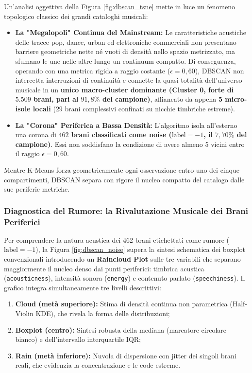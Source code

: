 Un'analisi oggettiva della Figura \ref{fig:dbscan_tsne} mette in luce un fenomeno topologico classico dei grandi cataloghi musicali:
\begin{itemize}
    \item \textbf{La "Megalopoli" Continua del Mainstream:} Le caratteristiche acustiche delle tracce pop, dance, urban ed elettroniche commerciali non presentano barriere geometriche nette né vuoti di densità nello spazio metrizzato, ma sfumano le une nelle altre lungo un continuum compatto. Di conseguenza, operando con una metrica rigida a raggio costante ($\epsilon = 0,60$), DBSCAN non intercetta interruzioni di continuità e connette la quasi totalità dell'universo musicale in un \textbf{unico macro-cluster dominante (Cluster 0, forte di $5.509$ brani, pari al $91,8\%$ del campione)}, affiancato da appena \textbf{5 micro-isole locali} ($29$ brani complessivi confinati su nicchie timbriche estreme).
    \item \textbf{La "Corona" Periferica a Bassa Densità:} L'algoritmo isola all'esterno una corona di \textbf{$462$ brani classificati come noise ($\text{label} = -1$, il $7,70\%$ del campione)}. Essi non soddisfano la condizione di avere almeno 5 vicini entro il raggio $\epsilon=0,60$.
\end{itemize}
Mentre K-Means forza geometricamente ogni osservazione entro uno dei cinque compartimenti, DBSCAN separa con rigore il nucleo compatto del catalogo dalle sue periferie metriche.

\subsubsection{Diagnostica del Rumore: la Rivalutazione Musicale dei Brani Periferici}

Per comprendere la natura acustica dei 462 brani etichettati come rumore ($\text{label} = -1$), la Figura \ref{fig:dbscan_noise} supera la sintesi schematica dei boxplot convenzionali introducendo un \textbf{Raincloud Plot} sulle tre variabili che separano maggiormente il nucleo denso dai punti periferici: timbrica acustica (\texttt{acousticness}), intensità sonora (\texttt{energy}) e contenuto parlato (\texttt{speechiness}). Il grafico integra simultaneamente tre livelli descrittivi:
\begin{enumerate}
    \item \textbf{Cloud (metà superiore):} Stima di densità continua non parametrica (Half-Violin KDE), che rivela la forma delle distribuzioni;
    \item \textbf{Boxplot (centro):} Sintesi robusta della mediana (marcatore circolare bianco) e dell'intervallo interquartile IQR;
    \item \textbf{Rain (metà inferiore):} Nuvola di dispersione con jitter dei singoli brani reali, che evidenzia la concentrazione e le code estreme.
\end{enumerate}

